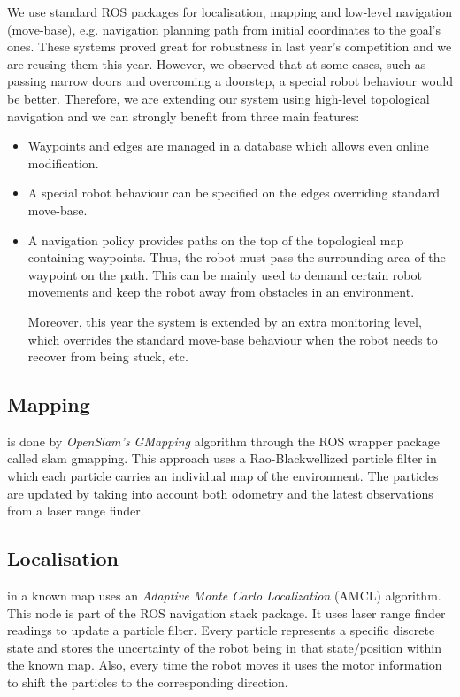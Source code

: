 We use standard ROS packages for localisation, mapping and low-level navigation (move-base), e.g. navigation planning path from initial coordinates to the goal's ones. 
These systems proved great for robustness in last year's competition and we are reusing them this year. However, we observed that at some cases, such as passing narrow doors and overcoming a doorstep, a special robot behaviour would be better. 
Therefore, we are extending our system using high-level topological navigation \cite{jaime} and we can strongly benefit from three main features:
\begin{itemize}
\item Waypoints and edges are managed in a database which allows even online modification.  
\item A special robot behaviour can be specified on the edges overriding standard move-base.
\item A navigation policy \cite{bruno} provides paths on the top of the topological map containing waypoints. 
 Thus, the robot must pass the surrounding area of the waypoint on the path. This can be mainly used to demand certain robot movements and keep the robot away from obstacles in an environment.
 
Moreover, this year the system is extended by an extra monitoring level, which overrides the standard move-base behaviour when the robot needs to recover from being stuck, etc. 

\end{itemize}

\subsection{Mapping} is done by \textit{OpenSlam's GMapping} algorithm \cite{slam} through the ROS wrapper package called \textsf{slam gmapping}. This approach uses a Rao-Blackwellized particle filter in which each particle carries an individual map of the environment. The particles are updated by taking into account both odometry and the latest observations from a laser range finder.

\subsection{Localisation} in a known map uses an \textit{Adaptive Monte Carlo Localization} (AMCL)\cite{amcl} algorithm. This node is part of the ROS \textsf{navigation stack} package. It uses laser range finder readings to update a particle filter. Every particle represents a specific discrete state and stores the uncertainty of the robot being in that state/position within the known map. Also, every time the robot moves it uses the motor information to shift the particles to the corresponding direction.

